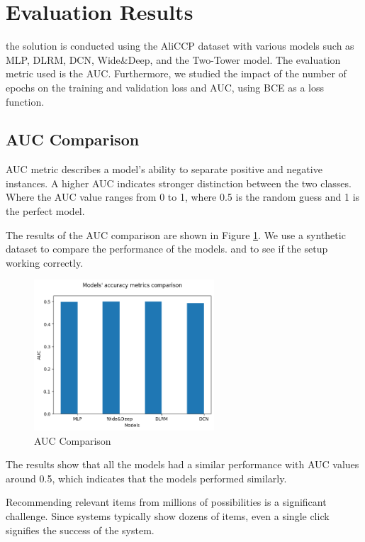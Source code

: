 
\section{Evaluation Results}
the solution is conducted using the AliCCP dataset with various models such as MLP, DLRM, DCN, Wide\&Deep, and the Two-Tower model. The evaluation metric used is the AUC. Furthermore, we studied the impact of the number of epochs on the training and validation loss and AUC, using BCE as a loss function.
\subsection{AUC Comparison}

AUC metric describes a model's ability to separate positive and negative instances. A higher AUC indicates stronger distinction between the two classes. Where the AUC value ranges from 0 to 1, where 0.5 is the random guess and 1 is the perfect model.

The results of the AUC comparison are shown in Figure \ref{fig:AUCComparison}. We use a synthetic dataset to compare the performance of the models. and to see if the setup working correctly.
\begin{figure}[H]
    \centering
    \includegraphics[width=0.6\textwidth]{assets/models_comparasion.png}
    \caption[AUC Comparison]{AUC Comparison}
    \label{fig:AUCComparison}
\end{figure}

The results show that all the models had a similar performance with AUC values around 0.5, which indicates that the models performed similarly.

Recommending relevant items from millions of possibilities is a significant challenge. 
Since systems typically show dozens of items, even a single click signifies the success of the system.
